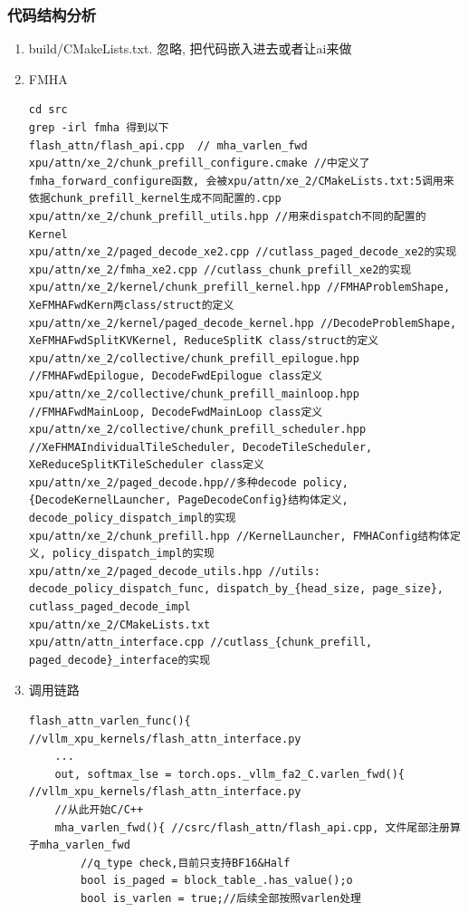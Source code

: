 \subsubsection{代码结构分析}
\begin{enumerate}
    \item build/CMakeLists.txt. 忽略, 把代码嵌入进去或者让ai来做
    \item FMHA
\begin{lstlisting}
cd src
grep -irl fmha 得到以下
flash_attn/flash_api.cpp  // mha_varlen_fwd
xpu/attn/xe_2/chunk_prefill_configure.cmake //中定义了fmha_forward_configure函数, 会被xpu/attn/xe_2/CMakeLists.txt:5调用来依据chunk_prefill_kernel生成不同配置的.cpp
xpu/attn/xe_2/chunk_prefill_utils.hpp //用来dispatch不同的配置的Kernel
xpu/attn/xe_2/paged_decode_xe2.cpp //cutlass_paged_decode_xe2的实现
xpu/attn/xe_2/fmha_xe2.cpp //cutlass_chunk_prefill_xe2的实现
xpu/attn/xe_2/kernel/chunk_prefill_kernel.hpp //FMHAProblemShape, XeFMHAFwdKern两class/struct的定义
xpu/attn/xe_2/kernel/paged_decode_kernel.hpp //DecodeProblemShape, XeFMHAFwdSplitKVKernel, ReduceSplitK class/struct的定义
xpu/attn/xe_2/collective/chunk_prefill_epilogue.hpp //FMHAFwdEpilogue, DecodeFwdEpilogue class定义
xpu/attn/xe_2/collective/chunk_prefill_mainloop.hpp //FMHAFwdMainLoop, DecodeFwdMainLoop class定义
xpu/attn/xe_2/collective/chunk_prefill_scheduler.hpp //XeFHMAIndividualTileScheduler, DecodeTileScheduler, XeReduceSplitKTileScheduler class定义
xpu/attn/xe_2/paged_decode.hpp//多种decode policy, {DecodeKernelLauncher, PageDecodeConfig}结构体定义, decode_policy_dispatch_impl的实现
xpu/attn/xe_2/chunk_prefill.hpp //KernelLauncher, FMHAConfig结构体定义, policy_dispatch_impl的实现
xpu/attn/xe_2/paged_decode_utils.hpp //utils: decode_policy_dispatch_func, dispatch_by_{head_size, page_size}, cutlass_paged_decode_impl
xpu/attn/xe_2/CMakeLists.txt
xpu/attn/attn_interface.cpp //cutlass_{chunk_prefill, paged_decode}_interface的实现
\end{lstlisting}
    \item 调用链路
\begin{lstlisting}
flash_attn_varlen_func(){ //vllm_xpu_kernels/flash_attn_interface.py
    ...
    out, softmax_lse = torch.ops._vllm_fa2_C.varlen_fwd(){ //vllm_xpu_kernels/flash_attn_interface.py
	//从此开始C/C++
	mha_varlen_fwd(){ //csrc/flash_attn/flash_api.cpp, 文件尾部注册算子mha_varlen_fwd
	    //q_type check,目前只支持BF16&Half 
	    bool is_paged = block_table_.has_value();o
	    bool is_varlen = true;//后续全部按照varlen处理

\end{lstlisting}
\end{enumerate}
